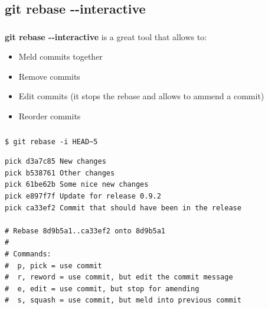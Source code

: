 
\subsection{git rebase -{}-interactive}

\begin{frame}
  \begin{center}
    \textbf{\Huge{\insertsubsection}}
  \end{center}
\end{frame}


\begin{frame}
  \frametitle{\insertsubsection}

  \textbf{git rebase -{}-interactive} is a great tool that allows to:

  \begin{itemize}
    \item Meld commits together
    \item Remove commits
    \item Edit commits (it stops the rebase and allows to ammend a commit)
    \item Reorder commits
  \end{itemize}

\end{frame}


\begin{frame}[fragile]
  \frametitle{\insertsubsection}

\begin{verbatim}
$ git rebase -i HEAD~5
\end{verbatim}

  \begin{footnotesize}
\begin{verbatim}
pick d3a7c85 New changes
pick b538761 Other changes
pick 61be62b Some nice new changes
pick e897f7f Update for release 0.9.2
pick ca33ef2 Commit that should have been in the release

# Rebase 8d9b5a1..ca33ef2 onto 8d9b5a1
#
# Commands:
#  p, pick = use commit
#  r, reword = use commit, but edit the commit message
#  e, edit = use commit, but stop for amending
#  s, squash = use commit, but meld into previous commit
\end{verbatim}
  \end{footnotesize}

\end{frame}

